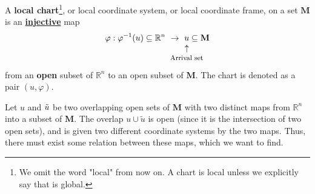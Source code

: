 \documentclass[../main.tex]{subfiles}
\begin{document}
\begin{definition}
A \textbf{local chart}\footnote{We omit the word "local" from now on. A chart is local unless we explicitly say that is global.},  or local coordinate system, or local coordinate frame, on a set $\mathbf{M}$ is an \underline{\textbf{injective}} map
\[
\varphi: \varphi^{-1}(u)\subseteq \mathbb{R}^n \ \rightarrow \ \underset{\mathclap{\tikz \node {$\uparrow$} node [below=1ex] {\footnotesize Arrival set};}}{u} \subseteq \mathbf{M}
\]
from an \textbf{open} subset of $\mathbb{R}^n$ to an open subset of $\mathbf{M}$. The chart is denoted as a pair
\(
\left(u,\varphi\right)
\).
\end{definition}
Let $u$ and $\Tilde{u}$ be two overlapping open sets of $\mathbf{M}$ with two distinct maps from $\mathbb{R}^n$ into a subset of $\mathbf{M}$. The overlap $u\cup\tilde{u}$ is open (since it is the intersection of two open sets), and is given two different coordinate systems by the two maps. Thus, there must exist some relation between these maps, which we want to find.
\end{document}
